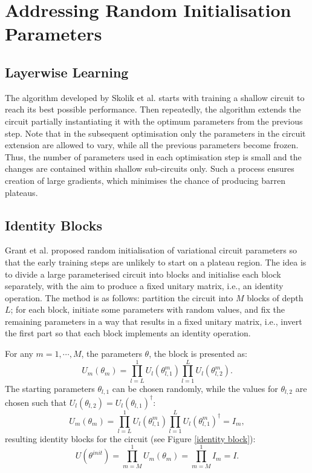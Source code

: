 \section{Addressing Random Initialisation Parameters}

\subsection{Layerwise Learning}
The algorithm developed by Skolik et al. \cite{skolikLayerwiseLearningQuantum2021} starts with training a shallow circuit to reach its best possible performance. Then repeatedly, the algorithm extends the circuit partially instantiating it with the optimum parameters from the previous step.
Note that in the subsequent optimisation only the parameters in the circuit extension are allowed to vary, while all the previous parameters become frozen.
Thus, the number of parameters used in each optimisation step is small and the changes are contained within shallow sub-circuits only. Such a process ensures creation of large gradients, which minimises the chance of producing barren plateaus.


\subsection{Identity Blocks} \label{Sec: Identity blocks}

Grant et al. \cite{grantInitializationStrategyAddressing2019} proposed random initialisation of variational circuit parameters so that the early training steps are unlikely to start on a plateau region.
The idea is to divide a large parameterised circuit into blocks and initialise each block separately, with the aim to produce a fixed unitary matrix, i.e., an identity operation.
The method is as follows: partition the circuit into $M$ blocks of depth $L$; for each block, initiate some parameters with random values, and fix the remaining parameters in a way that results in a fixed unitary matrix, i.e., invert the first part so that each block implements an identity operation.

For any $m = 1, \cdots, M$, the parameters $\theta$, the block is presented as:
\begin{equation}
    U_m(\theta_m)
    = \prod_{l=L}^1 U_l(\theta_{l,1}^m) \prod_{l=1}^L U_l(\theta_{l,2}^m).
\end{equation}
The starting parameters $\theta_{l,1}$ can be chosen randomly, while the values for $\theta_{l,2}$ are chosen such that $U_l(\theta_{l,2}) = U_l(\theta_{l,1})^\dagger$:
\begin{equation}
    U_m(\theta_m)
    = \prod_{l=L}^1 U_l(\theta_{l,1}^m)
    \prod_{l=1}^L U_l(\theta_{l,1}^m)^\dagger
    = I_m,
\end{equation}
resulting identity blocks for the circuit (see Figure \ref{identity block}):
\begin{equation}
    U(\theta^{init})
    = \prod_{m=M}^1 U_m(\theta_m)
    = \prod_{m=M}^1 I_m
    = I.
\end{equation}

